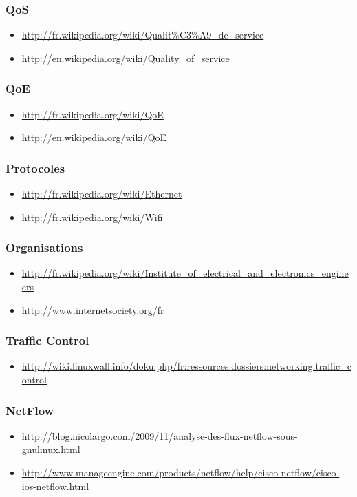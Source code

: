 \documentclass[french]{article}
\begin{document}
\subsubsection*{QoS}
\begin{itemize}
	\item \url{http://fr.wikipedia.org/wiki/Qualit%C3%A9_de_service}
	\item \url{http://en.wikipedia.org/wiki/Quality_of_service}
\end{itemize}

\subsubsection*{QoE}
\begin{itemize}
\item \url{http://fr.wikipedia.org/wiki/QoE}
\item \url{http://en.wikipedia.org/wiki/QoE}
\end{itemize}

\subsubsection*{Protocoles}
\begin{itemize}
\item \url{http://fr.wikipedia.org/wiki/Ethernet}
\item \url{http://fr.wikipedia.org/wiki/Wifi}
\end{itemize}

\subsubsection*{Organisations}
\begin{itemize}
\item \url{http://fr.wikipedia.org/wiki/Institute_of_electrical_and_electronics_engineers}
\item \url{http://www.internetsociety.org/fr}
\end{itemize}

\subsubsection*{Traffic Control}
\begin{itemize}
\item \url{http://wiki.linuxwall.info/doku.php/fr:ressources:dossiers:networking:traffic_control}
\end{itemize}

\subsubsection*{NetFlow}
\begin{itemize}
\item \url{http://blog.nicolargo.com/2009/11/analyse-des-flux-netflow-sous-gnulinux.html}
\item \url{http://www.manageengine.com/products/netflow/help/cisco-netflow/cisco-ios-netflow.html}
\end{itemize}
\end{document}
